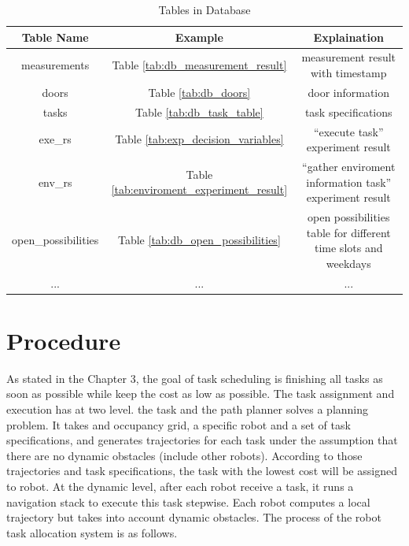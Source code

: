 \begin{table}[htb]
\centering
\begin{tabular}{|c|c|c|} 
\hline
Table Name & Example & Explaination \\ \hline
measurements & Table \ref{tab:db_measurement_result}  & measurement result with timestamp \\ \hline
doors   & Table \ref{tab:db_doors} & door information \\ \hline
tasks & Table \ref{tab:db_task_table} & task specifications  \\ \hline 
exe\_rs  & Table \ref{tab:exp_decision_variables} & ``execute task'' experiment result \\ \hline
env\_rs & Table \ref{tab:enviroment_experiment_result} & ``gather enviroment information task'' experiment result \\ \hline
open\_possibilities & Table \ref{tab:db_open_possibilities} & open possibilities table for different time slots and weekdays \\ \hline
... & ... & ... \\ \hline
\end{tabular}
\caption{Tables in Database}
\label{tab:tables_in_database}
\end{table}



\section{Procedure}
\label{sec:task_allocation_procedure}
As stated in the Chapter 3, the goal of task scheduling is finishing all tasks as soon as possible while keep the cost as low as possible. 
The task assignment and execution has at two level. \cite{Ivan2017} the task and the path planner solves a planning problem. It takes and occupancy grid, a specific robot and a set of task specifications, and generates trajectories for each task under the assumption that there are no dynamic obstacles (include other robots). According to those trajectories and task specifications, the task with the lowest cost will be assigned to robot.
At the dynamic level, after each robot receive a task, it runs a navigation stack to execute this task stepwise. Each robot computes a local trajectory but takes into account dynamic obstacles.
The process of the robot task allocation system is as follows.


